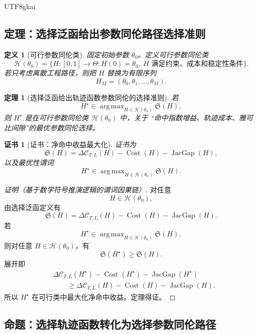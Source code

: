 \documentclass[12pt]{article}
\newtheorem{definition}{定义}[section]
\newtheorem{theorem}{定理}[section]
\newtheorem{Certificate}{证书}[section]
\DeclareMathOperator{\Cost}{Cost}
\DeclareMathOperator{\JacGap}{JacGap}
\DeclareMathOperator*{\argmax}{arg\,max}
\begin{document}
\begin{CJK*}{UTF8}{gkai}
\subsection{定理：选择泛函给出参数同伦路径选择准则}
\label{subsec:tex57-selection-theorem}

\begin{definition}[可行参数同伦类]
\label{def:tex57-feasible-homotopy-class}
固定初始参数 \(\theta_0\)。定义可行参数同伦类
\[
  \mathcal H(\theta_0)
  =
  \{H:[0,1]\to\Theta:
  H(0)=\theta_0,\ H\text{ 满足约束、成本和稳定性条件}\}.
\]
若只考虑离散工程路径，则把 \(H\) 替换为有限序列
\[
  H_M=(\theta_0,\theta_1,\ldots,\theta_M).
\]
\end{definition}

\begin{theorem}[选择泛函给出轨迹函数参数同伦的选择准则]
\label{thm:tex57-selection-criterion}
若
\[
  H^\star
  \in
  \argmax_{H\in\mathcal H(\theta_0)}
  \mathfrak S(H),
\]
则 \(H^\star\) 是在可行参数同伦类 \(\mathcal H(\theta_0)\) 中，关于
“命中指数增益、轨迹成本、雅可比间隙”的最优参数同伦选择。
\end{theorem}

\begin{Certificate}[证书：净命中收益最大化]
\label{cert:tex57-selection-criterion}
证书为
\[
  \mathfrak S(H)
  =
  \Delta\mathcal C_{T,L}(H)
  -
  \Cost(H)
  -
  \JacGap(H),
\]
以及最优性谓词
\[
  H^\star\in\argmax_{H\in\mathcal H(\theta_0)}\mathfrak S(H).
\]
\end{Certificate}

\begin{proof}[证明（基于数学符号推演逻辑的谓词因果链）]
对任意
\[
  H\in\mathcal H(\theta_0),
\]
由选择泛函定义有
\[
  \mathfrak S(H)
  =
  \Delta\mathcal C_{T,L}(H)
  -
  \Cost(H)
  -
  \JacGap(H).
\]
若
\[
  H^\star
  \in
  \argmax_{H\in\mathcal H(\theta_0)}
  \mathfrak S(H),
\]
则对任意 \(H\in\mathcal H(\theta_0)\)，有
\[
  \mathfrak S(H^\star)\ge\mathfrak S(H).
\]
展开即
\[
\begin{aligned}
&\Delta\mathcal C_{T,L}(H^\star)
-
\Cost(H^\star)
-
\JacGap(H^\star)\\
&\qquad\ge
\Delta\mathcal C_{T,L}(H)
-
\Cost(H)
-
\JacGap(H).
\end{aligned}
\]
所以 \(H^\star\) 在可行类中最大化净命中收益。定理得证。
\end{proof}

\subsection{命题：选择轨迹函数转化为选择参数同伦路径}
\label{subsec:tex57-proposition-reduction}


\end{CJK*}
\end{document}
